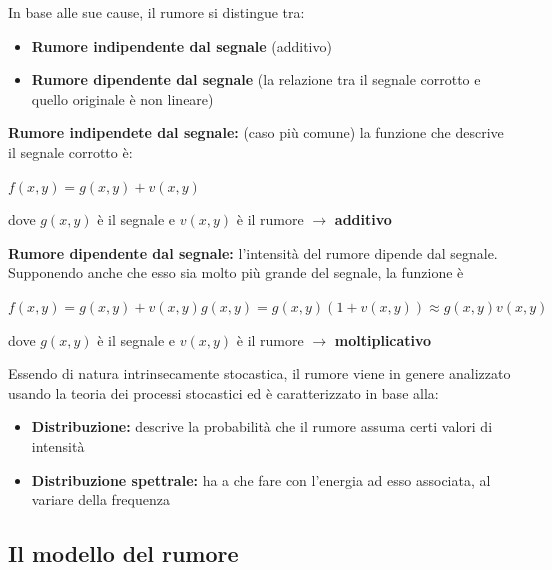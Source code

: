 In base alle sue cause, il rumore si distingue tra:
\begin{itemize}
    \item \textbf{Rumore indipendente dal segnale} (additivo)
    \item \textbf{Rumore dipendente dal segnale} (la relazione tra il segnale corrotto e quello originale è non lineare)
\end{itemize}

\begin{trivlist}
    \item \textbf{Rumore indipendete dal segnale:} (caso più comune) la funzione che descrive il segnale corrotto è:

    \begin{center}
        $f(x,y) = g(x,y)+v(x,y)$
    \end{center}

    dove $g(x,y)$ è il segnale e $v(x,y)$ è il rumore $\rightarrow$ \textbf{additivo}

    \item \textbf{Rumore dipendente dal segnale:} l'intensità del rumore dipende dal
    segnale. Supponendo anche che esso sia molto più grande del segnale, la funzione è

    \begin{center}
        $f(x,y)=g(x,y)+v(x,y)g(x,y)=g(x,y)(1+v(x,y)) \approx g(x,y)v(x,y)$
    \end{center}

    dove $g(x,y)$ è il segnale e $v(x,y)$ è il rumore $\rightarrow$ \textbf{moltiplicativo}
\end{trivlist}

Essendo di natura intrinsecamente stocastica, il rumore viene in genere analizzato usando la teoria dei processi stocastici ed è
caratterizzato in base alla:

\begin{itemize}
    \item \textbf{Distribuzione:} descrive la probabilità che il rumore assuma
          certi valori di intensità
    \item \textbf{Distribuzione spettrale:} ha a che fare con l'energia ad esso
          associata, al variare della frequenza
\end{itemize}

\subsection{Il modello del rumore}

